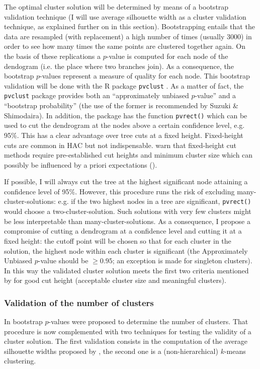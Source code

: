 The optimal cluster solution will be determined by means of a bootstrap validation technique (I will use average silhouette width as a cluster validation technique, as explained further on in this section). Bootstrapping entails that the data are resampled (with replacement) a high number of times (usually 3000) in order to see how many times the same points are clustered together again. On the basis of these replications a $p$-value is computed for each node of the dendogram (i.e. the place where two branches join). As a consequence, the bootstrap $p$-values represent a measure of quality for each node. This bootstrap validation will be done with the R package \texttt{pvclust} \citep{suzuki_pvclust:_2006}. As a matter of fact, the \texttt{pvclust} package provides both an “approximately unbiased $p$-value” and a “bootstrap probability” (the use of the former is recommended by Suzuki \& Shimodaira). In addition, the package has the function \texttt{pvrect()} which can be used to cut the dendrogram at the nodes above a certain confidence level, e.g. 95\%. This has a clear advantage over tree cuts at a fixed height. Fixed-height cuts are common in HAC but not indispensable. \citeauthor{everitt_cluster_2011} warn that fixed-height cut methods require pre-established cut heights and minimum cluster size which can possibly be influenced by a priori expectations (\citeyear[95]{everitt_cluster_2011}).\largerpage

If possible, I will always cut the tree at the highest significant node attaining a confidence level of 95\%. However, this procedure runs the risk of excluding many-cluster-solutions: e.g. if the two highest nodes in a tree are significant, \texttt{pvrect()} would choose a two-cluster-solution. Such solutions with very few clusters might be less interpretable than  many-cluster-solutions. As a consequence, I propose a compromise of cutting a dendrogram at a confidence level and cutting it at a fixed height: the cutoff point will be chosen so that for each cluster in the solution, the highest node within each cluster is significant (the Approximately Unbiased $p$-value should be $\geq 0.95$; an exception is made for singleton clusters). In this way the validated cluster solution meets the first two criteria mentioned by \citeauthor{glynn_cluster_2014} for good cut height (acceptable cluster size and meaningful clusters).

\subsubsection{Validation of the number of clusters}\label{sec:3.7.2.4}
In  bootstrap $p$-values were proposed to determine the number of clusters. That procedure is now complemented with two techniques for testing the validity of a cluster solution. The first validation consists in the computation of the average silhouette widths proposed by \citet{kaufman_finding_1990}, the second one is a (non-hierarchical) $k$-means clustering.


